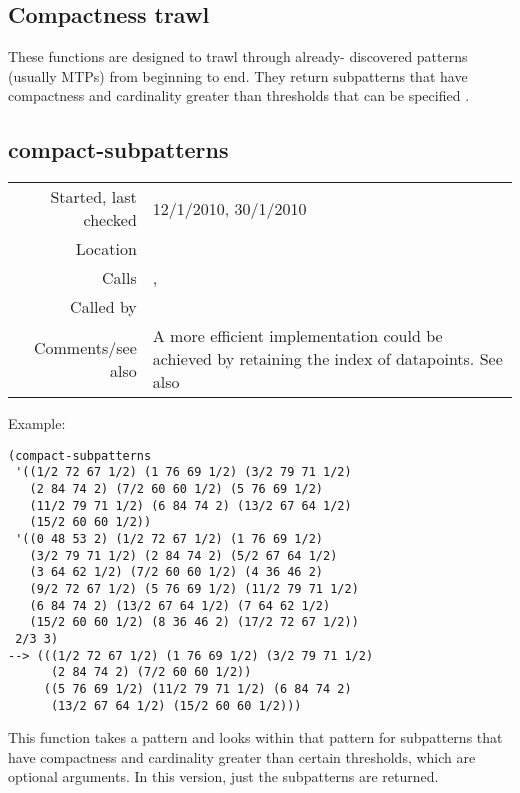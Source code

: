 \subsection{Compactness trawl}\label{sec:compactness-trawl}

These functions are designed to trawl through already-
discovered patterns (usually MTPs) from beginning to
end. They return subpatterns that have compactness
\citep{meredith2003} and cardinality greater than
thresholds that can be specified
\citep{collins2010b}.


\subsection*{compact-subpatterns}\label{fun:compact-subpatterns}

\vspace{0.3cm}
\begin{tabular}{r|p{8cm}}
Started, last checked & 12/1/2010, 30/1/2010 \\
Location & \nameref{sec:compactness-trawl} \\
Calls & \nameref{fun:compactness}, \nameref{fun:my-last} \\
Called by & \\
Comments/see also & A more efficient implementation could be achieved by retaining the index of datapoints. See also \nameref{fun:compact-subpatterns-more-output}
\end{tabular}

\vspace{0.5cm}
\noindent Example:
\begin{verbatim}
(compact-subpatterns
 '((1/2 72 67 1/2) (1 76 69 1/2) (3/2 79 71 1/2)
   (2 84 74 2) (7/2 60 60 1/2) (5 76 69 1/2)
   (11/2 79 71 1/2) (6 84 74 2) (13/2 67 64 1/2)
   (15/2 60 60 1/2))
 '((0 48 53 2) (1/2 72 67 1/2) (1 76 69 1/2)
   (3/2 79 71 1/2) (2 84 74 2) (5/2 67 64 1/2)
   (3 64 62 1/2) (7/2 60 60 1/2) (4 36 46 2)
   (9/2 72 67 1/2) (5 76 69 1/2) (11/2 79 71 1/2)
   (6 84 74 2) (13/2 67 64 1/2) (7 64 62 1/2)
   (15/2 60 60 1/2) (8 36 46 2) (17/2 72 67 1/2))
 2/3 3)
--> (((1/2 72 67 1/2) (1 76 69 1/2) (3/2 79 71 1/2)
      (2 84 74 2) (7/2 60 60 1/2))
     ((5 76 69 1/2) (11/2 79 71 1/2) (6 84 74 2)
      (13/2 67 64 1/2) (15/2 60 60 1/2)))
\end{verbatim}

\noindent This function takes a pattern and looks
within that pattern for subpatterns that have
compactness and cardinality greater than certain
thresholds, which are optional arguments. In this
version, just the subpatterns are returned.


